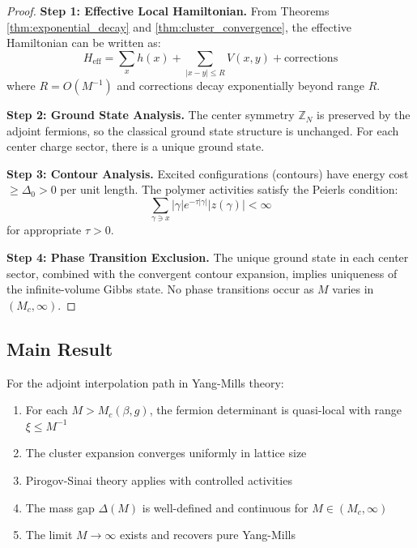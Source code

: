 \begin{proof}
\textbf{Step 1: Effective Local Hamiltonian.}
From Theorems \ref{thm:exponential_decay} and \ref{thm:cluster_convergence}, the effective Hamiltonian can be written as:
\begin{equation}
H_{\text{eff}} = \sum_x h(x) + \sum_{|x-y| \leq R} V(x,y) + \text{corrections}
\end{equation}
where $R = O(M^{-1})$ and corrections decay exponentially beyond range $R$.

\textbf{Step 2: Ground State Analysis.}
The center symmetry $\mathbb{Z}_N$ is preserved by the adjoint fermions, so the classical ground state structure is unchanged. For each center charge sector, there is a unique ground state.

\textbf{Step 3: Contour Analysis.}
Excited configurations (contours) have energy cost $\geq \Delta_0 > 0$ per unit length. The polymer activities satisfy the Peierls condition:
\begin{equation}
\sum_{\gamma \ni x} |\gamma| e^{-\tau |\gamma|} |z(\gamma)| < \infty
\end{equation}
for appropriate $\tau > 0$.

\textbf{Step 4: Phase Transition Exclusion.}
The unique ground state in each center sector, combined with the convergent contour expansion, implies uniqueness of the infinite-volume Gibbs state. No phase transitions occur as $M$ varies in $(M_c, \infty)$.
\end{proof}

\subsection{Main Result}

\begin{theorem}
\label{thm:main_locality_result}
For the adjoint interpolation path in Yang-Mills theory:
\begin{enumerate}
    \item For each $M > M_c(\beta, g)$, the fermion determinant is quasi-local with range $\xi \leq M^{-1}$
    \item The cluster expansion converges uniformly in lattice size
    \item Pirogov-Sinai theory applies with controlled activities
    \item The mass gap $\Delta(M)$ is well-defined and continuous for $M \in (M_c, \infty)$
    \item The limit $M \to \infty$ exists and recovers pure Yang-Mills
\end{enumerate}
\end{theorem}


